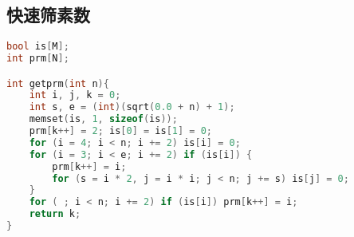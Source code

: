 \subsection{快速筛素数}
    \begin{lstlisting}[language=c++]
bool is[M];
int prm[N];

int getprm(int n){
    int i, j, k = 0;
    int s, e = (int)(sqrt(0.0 + n) + 1);
    memset(is, 1, sizeof(is));
    prm[k++] = 2; is[0] = is[1] = 0;
    for (i = 4; i < n; i += 2) is[i] = 0;
    for (i = 3; i < e; i += 2) if (is[i]) {
        prm[k++] = i;
        for (s = i * 2, j = i * i; j < n; j += s) is[j] = 0;
    }
    for ( ; i < n; i += 2) if (is[i]) prm[k++] = i;
    return k;
}
    \end{lstlisting}
